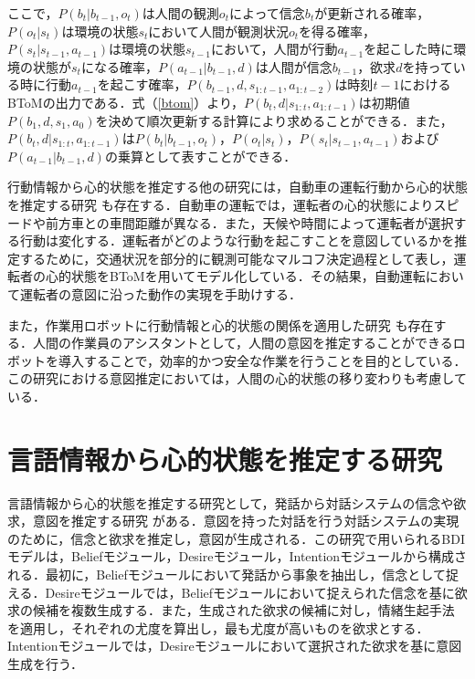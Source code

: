 ここで，$P(b_t|b_{t-1},o_t)$は人間の観測$o_t$によって信念$b_t$が更新される確率，$P(o_t|s_t)$は環境の状態$s_t$において人間が観測状況$o_t$を得る確率，$P(s_t|s_{t-1},a_{t-1})$は環境の状態$s_{t-1}$において，人間が行動$a_{t-1}$を起こした時に環境の状態が$s_t$になる確率，$P(a_{t-1}|b_{t-1},d)$は人間が信念$b_{t-1}$，欲求$d$を持っている時に行動$a_{t-1}$を起こす確率，$P(b_{t-1},d,s_{1:t-1},a_{1:t-2})$は時刻$t-1$におけるBToMの出力である．式（\ref{btom}）より，$P(b_t,d|s_{1:t},a_{1:t-1})$は初期値$P(b_1,d,s_1,a_0)$を決めて順次更新する計算により求めることができる．また，$P(b_t,d|s_{1:t},a_{1:t-1})$は$P(b_t|b_{t-1},o_t)$，$P(o_t|s_t)$，$P(s_t|s_{t-1},a_{t-1})$および$P(a_{t-1}|b_{t-1},d)$の乗算として表すことができる．


\par
行動情報から心的状態を推定する他の研究には，自動車の運転行動から心的状態を推定する研究 \cite{darwish2020learning}も存在する．自動車の運転では，運転者の心的状態によりスピードや前方車との車間距離が異なる．また，天候や時間によって運転者が選択する行動は変化する．運転者がどのような行動を起こすことを意図しているかを推定するために，交通状況を部分的に観測可能なマルコフ決定過程として表し，運転者の心的状態をBToMを用いてモデル化している．その結果，自動運転において運転者の意図に沿った動作の実現を手助けする．

\par
また，作業用ロボットに行動情報と心的状態の関係を適用した研究 \cite{inbook}も存在する．人間の作業員のアシスタントとして，人間の意図を推定することができるロボットを導入することで，効率的かつ安全な作業を行うことを目的としている．この研究における意図推定においては，人間の心的状態の移り変わりも考慮している．

\section{言語情報から心的状態を推定する研究}
\par
言語情報から心的状態を推定する研究として，発話から対話システムの信念や欲求，意図を推定する研究 \cite{高橋拓誠2015bdi}がある．意図を持った対話を行う対話システムの実現のために，信念と欲求を推定し，意図が生成される．この研究で用いられるBDIモデルは，Beliefモジュール，Desireモジュール，Intentionモジュールから構成される．最初に，Beliefモジュールにおいて発話から事象を抽出し，信念として捉える．Desireモジュールでは，Beliefモジュールにおいて捉えられた信念を基に欲求の候補を複数生成する．また，生成された欲求の候補に対し，情緒生起手法 \cite{2002}を適用し，それぞれの尤度を算出し，最も尤度が高いものを欲求とする．Intentionモジュールでは，Desireモジュールにおいて選択された欲求を基に意図生成を行う．

